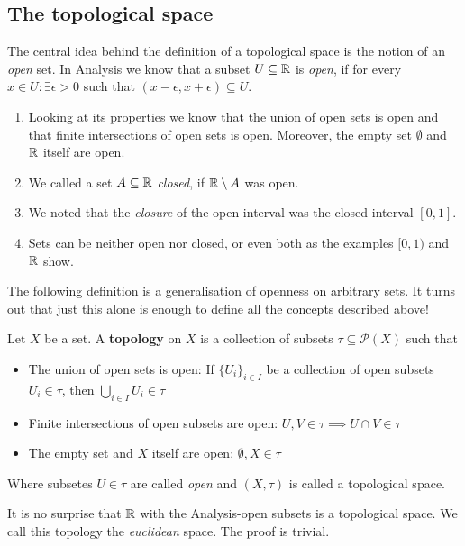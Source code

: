 \subsection{The topological space}
The central idea behind the definition of a topological space is the notion of an \emph{open} set. 
In Analysis we know that a subset $U \subseteq \mathbb{R}$ is \emph{open}, if for every $x \in U: \exists \epsilon >0$ such that $(x - \epsilon, x + \epsilon) \subseteq U$.
\begin{enumerate}
  \item Looking at its properties we know that the union of open sets is open and that finite intersections of open sets is open. Moreover, the empty set $\emptyset$ and $\mathbb{R}$ itself are open.
  \item We called a set $A \subseteq \mathbb{R}$ \emph{closed}, if $\mathbb{R} \setminus A$ was open.
  \item We noted that the \emph{closure} of the open interval was the closed interval $[0,1]$.
  \item Sets can be neither open nor closed, or even both as the examples $[0,1)$ and $\mathbb{R}$ show.
\end{enumerate}

The following definition is a generalisation of openness on arbitrary sets. 
It turns out that just this alone is enough to define all the concepts described above!

\begin{dfn}[]
  Let $X$ be a set. A \textbf{topology} on $X$ is a collection of subsets $\tau \subseteq \mathcal{P}(X)$ such that
  \begin{itemize}
    \item The union of open sets is open: If $\{U_i\}_{i \in I}$ be a collection of open subsets $U_i \in \tau$, then $\bigcup_{i \in I} U_i \in \tau$ 
    \item Finite intersections of open subsets are open: $U,V \in \tau \implies U \cap V \in \tau$
    \item The empty set and $X$ itself are open: $\emptyset, X \in \tau$
  \end{itemize}
  Where subsetes $U \in \tau$ are called \emph{open} and $(X,\tau)$ is called a topological space.
\end{dfn}

\begin{ex}[]
  It is no surprise that $\mathbb{R}$ with the Analysis-open subsets is a topological space. We call this topology the \emph{euclidean} space. The proof is trivial.
\end{ex}




